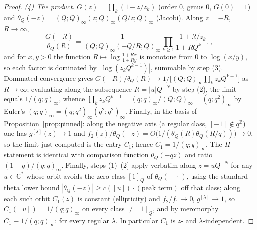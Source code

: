 \documentclass[11pt]{article}
\theoremstyle{plain}
\theoremstyle{definition}
\theoremstyle{remark}
\newcommand{\Z}{\mathbb{Z}}
\newcommand{\C}{\mathbb{C}}
\begin{document}
\begin{proof}
\emph{(4) The product.} $G(z)=\prod_k(1-z/z_k)$ (order $0$, genus $0$, $G(0)=1$) and
$\theta_Q(-z)=(Q;Q)_\infty(z;Q)_\infty(Q/z;Q)_\infty$ (Jacobi). Along $z=-R$, $R\to\infty$,
\[
   \frac{G(-R)}{\theta_Q(R)}
   =\frac1{(Q;Q)_\infty(-Q/R;Q)_\infty}\prod_{k\ge1}\frac{1+R/z_k}{1+RQ^{k-1}} ,
\]
and for $x,y>0$ the function $R\mapsto\log\frac{1+Rx}{1+Ry}$ is monotone from $0$ to $\log(x/y)$, so
each factor is dominated by $|\log(z_kQ^{k-1})|$, summable by step (3). Dominated convergence gives
$G(-R)/\theta_Q(R)\to1/\bigl[(Q;Q)_\infty\prod_kz_kQ^{k-1}\bigr]$ as $R\to\infty$; evaluating along
the subsequence $R=|u|Q^{-N}$ by step (2), the limit equals $1/(q;q)_\infty$, whence
$\prod_kz_kQ^{k-1}=(q;q)_\infty/(Q;Q)_\infty=(q;q^2)_\infty$ by Euler's
$(q;q)_\infty=(q;q^2)_\infty(q^2;q^2)_\infty$. Finally, in the basis of
Proposition~\ref{prop:pinned}: along the negative axis (a regular class, $[-1]\notin q^{\Z}$) one has
$g^{[\lambda]}(z)\to1$ and $f_2(z)/\theta_Q(-z)=O\bigl(1/(\theta_Q(R)\theta_Q(R/q))\bigr)\to0$, so
the limit just computed is the entry $C_1$; hence $C_1=1/(q;q)_\infty$. The $H$-statement is
identical with comparison function $\theta_Q(-qz)$ and ratio $(1-q)/(q;q)_\infty$.
Finally, steps (1)--(2) apply verbatim along $z=uQ^{-N}$ for any $u\in\C^*$ whose orbit avoids the
zero class $[1]_Q$ of $\theta_Q(-\,\cdot\,)$, using the standard theta lower bound
$|\theta_Q(-z)|\ge c([u])\cdot(\text{peak term})$ off that class; along each such orbit
$C_1(z)$ is constant (ellipticity) and $f_2/f_1\to0$, $g^{[\lambda]}\to1$, so
$C_1([u])=1/(q;q)_\infty$ on every class $\ne[1]_Q$, and by meromorphy $C_1\equiv1/(q;q)_\infty$: for every regular $\lambda$. In particular $C_1$ is $z$- and $\lambda$-independent.
\end{proof}
\end{document}
